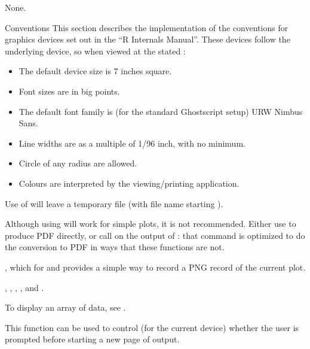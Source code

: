 %
\begin{Value}
None.
\end{Value}
%
\begin{Section}{Conventions}
This section describes the implementation of the conventions for
graphics devices set out in the ``R Internals Manual''.  These
devices follow the underlying device, so when viewed at the stated
:

\begin{itemize}

\item The default device size is 7 inches square.
\item Font sizes are in big points.
\item The default font family is (for the standard Ghostscript
setup) URW Nimbus Sans.
\item Line widths are as a multiple of 1/96 inch, with no minimum. 
\item Circle of any radius are allowed.
\item Colours are interpreted by the viewing/printing application.

\end{itemize}

\end{Section}
%
\begin{Note}\relax
Use of  will leave a temporary file (with file name
starting ).

Although using  will work for simple plots, it
is not recommended.  Either use  to produce PDF
directly, or call  on the
output of : that command is optimized to do
the conversion to PDF in ways that these functions are not.
\end{Note}
%
\begin{SeeAlso}\relax
{}, which for  and
 provides a simple way to record a PNG
record of the current plot.

, , ,
,  and  .

To display an array of data, see .
\end{SeeAlso}
%
\begin{Description}\relax
This function can be used to control (for the current device)
whether the user is prompted before starting a new page of output.
\end{Description}
